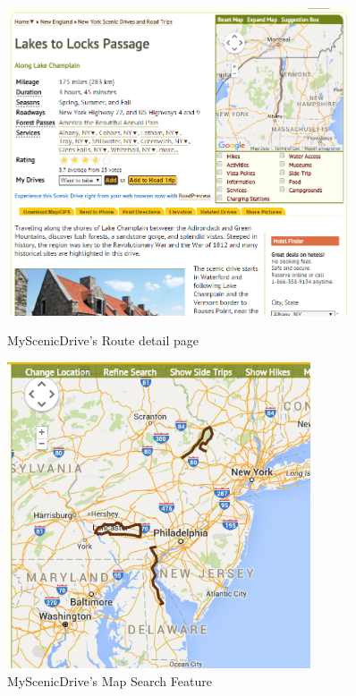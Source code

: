 \begin{figure}[!ht]
\centering
	\begin{minipage}{.49\textwidth}
		\begin{center}
			\includegraphics[width=0.9\textwidth]{images/msd-1.png}
			\caption{MyScenicDrive's Route detail page}
		\end{center}
	\end{minipage}
	\begin{minipage}{.49\textwidth}
		\begin{center}
			\includegraphics[width=0.8\textwidth]{images/msd-2.png}
			\caption{MyScenicDrive's Map Search Feature}
		\end{center}
	\end{minipage}
	\vspace{-10mm}
\end{figure}

